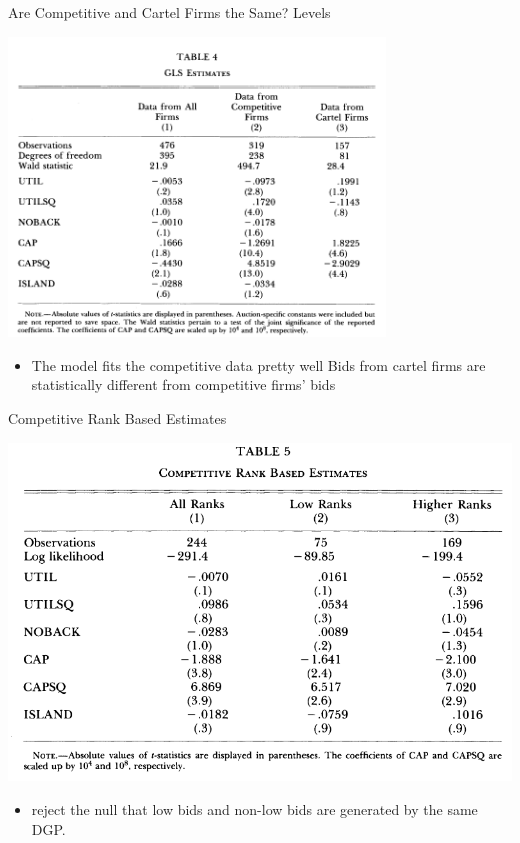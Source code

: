 \documentclass[dvipsnames]{beamer}
\begin{document}
%
\begin{frame}{Are Competitive and Cartel Firms the Same? Levels}
  \begin{center}
   \includegraphics[width=0.75\textwidth, keepaspectratio=true]{tab4.png}
  \end{center}
  \begin{itemize}
  \item The model fits the competitive data pretty well
    \vitem Bids from cartel firms are statistically different from competitive firms' bids
  \end{itemize}
\end{frame}
%
\begin{frame}{Competitive Rank Based Estimates}
  \begin{center}
   \includegraphics[width=\textwidth, keepaspectratio=true]{tab5.png} 
  \end{center}
  \begin{itemize}
  \item {} reject the null that low bids and non-low bids are generated by the same DGP.
  \end{itemize}
\end{frame}
\end{document}
